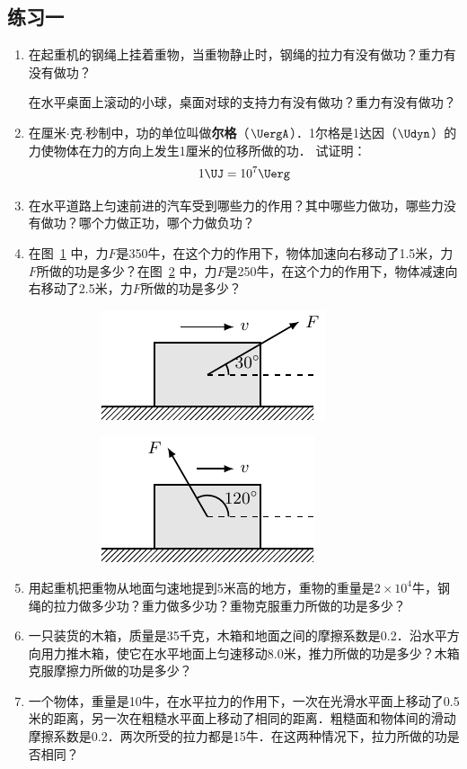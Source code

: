 \subsection*{练习一}
\begin{enumerate}
    \item 在起重机的钢绳上挂着重物，当重物静止时，钢绳的拉力有没有做功？重力有没有做功？

    在水平桌面上滚动的小球，桌面对球的支持力有没有做功？重力有没有做功？
    \item 在厘米$\cdot$克$\cdot$秒制中，功的单位叫做\textbf{尔格}（$\UergA$）．1尔格是1达因（$\Udyn$）的力使物体在力的方向上发生1厘米的位移所做的功．
    试证明：
    \[1 \UJ=10^7 \Uerg \]
    \item 在水平道路上匀速前进的汽车受到哪些力的作用？其中哪些力做功，哪些力没有做功？哪个力做正功，哪个力做负功？
    \item 在图~\ref{fig_A_7-5a} 中，力$F$是350牛，在这个力的作用下，物体加速向右移动了1.5米，力$F$所做的功是多少？在图~\ref{fig_A_7-5b} 中，力$F$是250牛，在这个力的作用下，物体减速向右移动了2.5米，力$F$所做的功是多少？

\begin{figure}[htbp]
    \centering
    \begin{subfigure} {0.4\linewidth} 
        \centering
        \includegraphics{fig/A/7-5a.pdf} 
        \caption{}\label{fig_A_7-5a} 
    \end{subfigure}
    \hfil
    \begin{subfigure} {0.4\linewidth} 
        \centering
        \includegraphics{fig/A/7-5b.pdf} 
        \caption{}\label{fig_A_7-5b} 
    \end{subfigure}
    \caption{}\label{fig_A_7-5}
\end{figure}

    \item 用起重机把重物从地面匀速地提到5米高的地方，重物的重量是$2\times 10^4$牛，钢绳的拉力做多少功？重力做多少功？重物克服重力所做的功是多少？
    \item 一只装货的木箱，质量是35千克，木箱和地面之间的摩擦系数是0.2．沿水平方向用力推木箱，使它在水平地面上匀速移动8.0米，推力所做的功是多少？木箱克服摩擦力所做的功是多少？
    \item 一个物体，重量是10牛，在水平拉力的作用下，一次在光滑水平面上移动了0.5米的距离，另一次在粗糙水平面上移动了相同的距离．粗糙面和物体间的滑动摩擦系数是0.2．两次所受的拉力都是15牛．在这两种情况下，拉力所做的功是否相同？
\end{enumerate}

